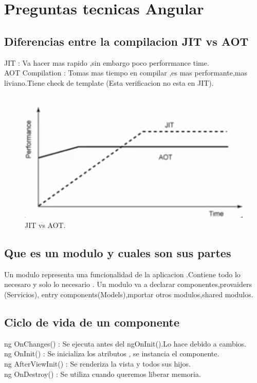 \chapter{Preguntas tecnicas Angular}
\section{Diferencias entre la compilacion JIT vs AOT}
JIT : Va hacer mas rapido ,sin embargo poco perforrmance time.\\
AOT Compilation : Tomas mas tiempo en compilar ,es mas performante,mas liviano.Tiene check de template
(Esta verificacion no esta en JIT).
\begin{figure}[H]
	\centering
	\includegraphics[scale=0.3]{images/fig_3_1.jpg}
	\caption{JIT vs AOT.}
\end{figure}
\section{Que es un modulo y cuales son sus partes}
Un modulo representa una funcionalidad de la aplicacion .Contiene todo lo necesaro y solo lo necesario .
Un modulo va a declarar componentes,provaiders (Servicios),
entry components(Models),mportar otros modulos,shared modulos.
\section{Ciclo de vida de un componente}
ng OnChanges() : Se ejecuta antes del ngOnInit().Lo hace debido a cambios.\\
ng OnInit() : Se inicializa los atributos , se instancia el componente.\\
ng AfterViewInit() : Se renderiza la vista y todos sus hijos.\\
ng OnDestroy() : Se utiliza cuando queremos liberar memoria.
